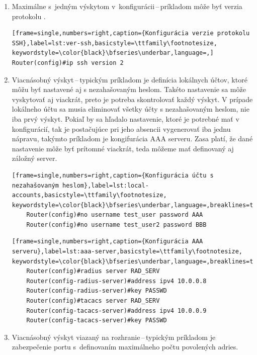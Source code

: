 \begin{enumerate}
	\item Maximálne s~jedným výskytom v~konfigurácii\,--\,príkladom môže byť verzia protokolu .
	
\begin{minipage}{\linewidth}
	
\begin{lstlisting}[frame=single,numbers=right,caption={Konfigurácia verzie protokolu SSH},label=lst:ver-ssh,basicstyle=\ttfamily\footnotesize, keywordstyle=\color{black}\bfseries\underbar,language=,]
Router(config)#ip ssh version 2
\end{lstlisting}
\end{minipage}
	
	\item \vspace{2em} Viacnásobný výskyt\,--\,typickým príkladom je  definícia lokálnych účtov, ktoré môžu byť nastavené aj s nezahašovaným heslom. Takéto nastavenie sa môže vyskytovať aj viackrát, preto je potreba skontrolovať každý výskyt. V prípade lokálneho účtu sa musia eliminovať všetky účty s nezahašovaným heslom, nie iba prvý výskyt. Pokiaľ by sa hľadalo nastavenie, ktoré je potrebné mať v konfigurácií, tak je postačujúce pri jeho absencii vygenerovať iba jednu nápravu, takýmto príkladom je kongifurácia AAA serveru. Zasa platí, že dané nastavenie môže byť prítomné viackrát, teda môžeme mať definovaný aj záložný server.

\begin{minipage}{\linewidth}		
	\begin{lstlisting}[frame=single,numbers=right,caption={Konfigurácia účtu s nezahašovaným heslom},label=lst:local-accounts,basicstyle=\ttfamily\footnotesize, keywordstyle=\color{black}\bfseries\underbar,language=,breaklines=true]
	Router(config)#no username test_user password AAA
	Router(config)#no username test_user2 password BBB
	\end{lstlisting}
\end{minipage}

\begin{minipage}{\linewidth}		
	\begin{lstlisting}[frame=single,numbers=right,caption={Konfigurácia AAA serveru},label=lst:aaa-server,basicstyle=\ttfamily\footnotesize, keywordstyle=\color{black}\bfseries\underbar,language=,breaklines=true]
	Router(config)#radius server RAD_SERV
	Router(config-radius-server)#address ipv4 10.0.0.8
	Router(config-radius-server)#key PASSWD
	Router(config)#tacacs server RAD_SERV
	Router(config-tacacs-server)#address ipv4 10.0.0.9
	Router(config-tacacs-server)#key PASSWD
	\end{lstlisting}
\end{minipage}		
\newpage	
	\item \vspace{2em} Viacnásobný výskyt viazaný na rozhranie\,--\,typickým príkladom je zabezpečenie portu s~definovaním maximálneho počtu povolených  adries.
	

\end{enumerate}
